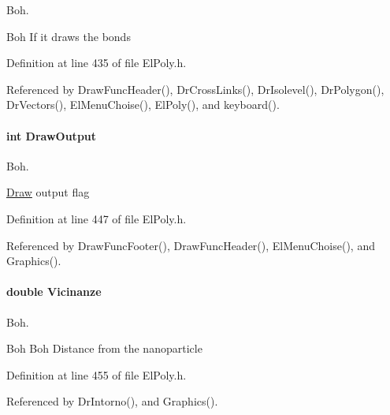 Boh. 

Boh If it draws the bonds 

Definition at line 435 of file El\+Poly.\+h.



Referenced by Draw\+Func\+Header(), Dr\+Cross\+Links(), Dr\+Isolevel(), Dr\+Polygon(), Dr\+Vectors(), El\+Menu\+Choise(), El\+Poly(), and keyboard().

\paragraph[{\texorpdfstring{Draw\+Output}{DrawOutput}}]{\setlength{\rightskip}{0pt plus 5cm}int Draw\+Output}\hypertarget{classElPoly_af2d26fec9f7faeae1c79eb64268776c0}{}\label{classElPoly_af2d26fec9f7faeae1c79eb64268776c0}


Boh. 

\hyperlink{classDraw}{Draw} output flag 

Definition at line 447 of file El\+Poly.\+h.



Referenced by Draw\+Func\+Footer(), Draw\+Func\+Header(), El\+Menu\+Choise(), and Graphics().

\paragraph[{\texorpdfstring{Vicinanze}{Vicinanze}}]{\setlength{\rightskip}{0pt plus 5cm}double Vicinanze}\hypertarget{classElPoly_ae8d6419041af331f07d9992abef3a867}{}\label{classElPoly_ae8d6419041af331f07d9992abef3a867}


Boh. 

Boh Boh Distance from the nanoparticle 

Definition at line 455 of file El\+Poly.\+h.



Referenced by Dr\+Intorno(), and Graphics().



